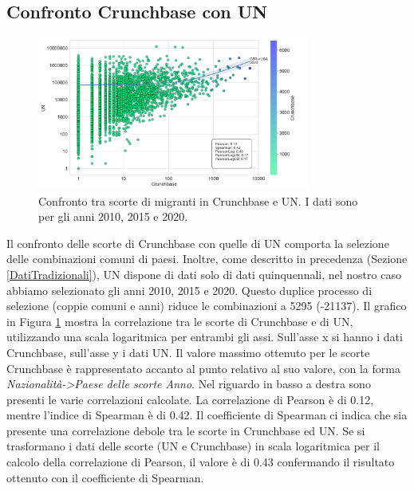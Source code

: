 \subsection{Confronto Crunchbase con UN}

\label{UN_stock}
\begin{figure}[!h]
    \centering
    \includegraphics[width=0.8\textwidth]{images/Migration_Stocks/Migration Stocks.png}
    \caption{Confronto tra scorte di migranti in Crunchbase e UN. I dati sono per gli anni 2010, 2015 e 2020.}
    \label{fig:LogaritmicMigrationStocksScatterPlot}
\end{figure}
Il confronto delle scorte di Crunchbase con quelle di UN comporta la selezione delle combinazioni comuni di paesi. Inoltre, come descritto in precedenza (Sezione \ref{DatiTradizionali}), UN dispone di dati solo di dati quinquennali, nel nostro caso abbiamo selezionato gli anni 2010, 2015 e 2020. Questo duplice processo di selezione (coppie comuni e anni) riduce le combinazioni a 5295 (-21137).
Il grafico in Figura  \ref{fig:LogaritmicMigrationStocksScatterPlot} mostra la correlazione tra le scorte di Crunchbase e di UN, utilizzando una scala logaritmica per entrambi gli assi. Sull'asse x si hanno i dati Crunchbase, sull'asse y i dati UN. Il valore massimo ottenuto per le scorte Crunchbase è rappresentato accanto al punto relativo al suo valore, con la forma \textit{Nazionalità->Paese delle scorte Anno}. Nel riguardo in basso a destra sono presenti le varie correlazioni calcolate. La correlazione di Pearson è di 0.12, mentre l'indice di Spearman è di 0.42. Il coefficiente di Spearman ci indica che sia presente una correlazione debole tra le scorte in Crunchbase ed UN. Se si trasformano i dati delle scorte (UN e Crunchbase) in scala logaritmica per il calcolo della correlazione di Pearson, il valore è di 0.43 confermando il risultato ottenuto con il coefficiente di Spearman.
\FloatBarrier

